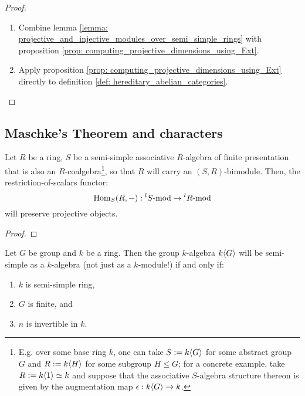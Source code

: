                 \begin{proof}
                    \noindent
                    \begin{enumerate}
                        \item Combine lemma \ref{lemma: projective_and_injective_modules_over_semi_simple_rings} with proposition \ref{prop: computing_projective_dimensions_using_Ext}.
                        \item Apply proposition \ref{prop: computing_projective_dimensions_using_Ext} directly to definition \ref{def: hereditary_abelian_categories}.
                    \end{enumerate}
                \end{proof}
        
        \subsection{Maschke's Theorem and characters}
            \begin{lemma} \label{lemma: projectivity_and_restriction_of_scalars}
                Let $R$ be a ring, $S$ be a semi-simple associative $R$-algebra of finite presentation that is also an $R$-coalgebra\footnote{E.g. over some base ring $k$, one can take $S := k\langle G\rangle$ for some abstract group $G$ and $R := k\langle H\rangle$ for some subgroup $H \leq G$; for a concrete example, take $R := k\langle1\rangle \simeq k$ and suppose that the associative $S$-algebra structure thereon is given by the augmentation map $\epsilon: k\langle G\rangle \to k$.}, so that $R$ will carry an $(S, R)$-bimodule. Then, the restriction-of-scalars functor:
                    $$\mathrm{Hom}_S(R, -): {}^lS\text{-}\mathrm{mod} \to {}^lR\text{-}\mathrm{mod}$$
                will preserve projective objects.
            \end{lemma}
                \begin{proof}
                    
                \end{proof}
            \begin{theorem} \label{theorem: maschke_theorem}
                Let $G$ be group and $k$ be a ring. Then the group $k$-algebra $k\langle G\rangle$ will be semi-simple as a $k$-algebra (not just as a $k$-module!) if and only if:
                    \begin{enumerate}
                        \item $k$ is semi-simple ring,
                        \item $G$ is finite, and
                        \item $n$ is invertible in $k$.
                    \end{enumerate}
            \end{theorem}
